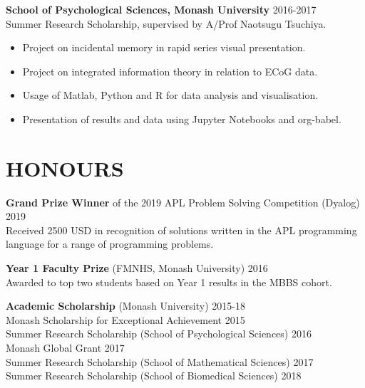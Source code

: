 \documentclass[margin]{res}
\begin{document}
\begin{resume}
  {\bf School of Psychological Sciences, Monash University} \hfill 2016-2017\\
  Summer Research Scholarship, supervised by A/Prof Naotsugu Tsuchiya.
  \begin{itemize} \itemsep -2pt
    \item Project on incidental memory in rapid series visual
      presentation.
    \item Project on integrated information theory in relation to ECoG
      data.
    \item Usage of Matlab, Python and R for data analysis and
      visualisation.
\item Presentation of results and data using Jupyter Notebooks and org-babel.
  \end{itemize}

\section{HONOURS}

{\bf Grand Prize Winner} of the 2019 APL Problem Solving Competition (Dyalog)
\hfill 2019\\
{\small Received 2500 USD in recognition of solutions written in the APL programming language for a range of programming problems.}


{\bf Year 1 Faculty Prize} (FMNHS, Monash University) \hfill 2016 \\
{\small Awarded to top two students based on Year 1 results in the MBBS cohort.}

{\bf Academic Scholarship} (Monash University) \hfill 2015-18 \\
{\small Monash Scholarship for Exceptional Achievement \hfill 2015}\\
{\small Summer Research Scholarship (School of Psychological Sciences) \hfill 2016}\\
{\small Monash Global Grant \hfill 2017}\\
{\small Summer Research Scholarship (School of Mathematical Sciences) \hfill
  2017}\\
{\small Summer Research Scholarship (School of Biomedical Sciences) \hfill 2018}


\end{resume}
\end{document}
